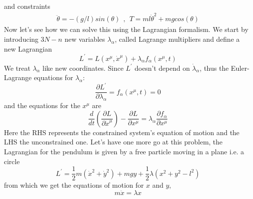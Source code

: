 and constraints
    \begin{align}
        \ddot{\theta} = -(g/l)sin(\theta) \ \ , \ \  T = ml\dot{\theta}^{2} + mg cos(\theta)
    \end{align}
Now let's see how we can solve this using the Lagrangian formalism. We start by introducing $3N-n$ new variables $\lambda_{\alpha}$, called Lagrange multipliers and define a new Lagrangian
\begin{equation}
    L^{'} = L(x^{\mu},\dot{x}^{\mu}) + \lambda_{\alpha} f_{\alpha}(x^{\mu},t)
\end{equation}
We treat $\lambda_{\alpha}$ like new coordinates. Since $L^{'}$ doesn't depend on $\dot{\lambda}_{\alpha}$, thus the Euler-Lagrange equations for $\lambda_{\alpha}$:
\begin{equation}
    \frac{\partial L^{'}}{\partial \lambda_{\alpha}} = f_{\alpha}(x^{\mu},t) = 0
\end{equation}
and the equations for the $x^{\mu}$ are
\begin{equation}
    \frac{d}{dt}\left( \frac{\partial L}{\partial \dot{x}^{\mu}} \right) - \frac{\partial L}{\partial x^{\mu}} = \lambda_{\alpha} \frac{\partial f_{\alpha}}{\partial x^{\mu}}
\end{equation}
Here the RHS represents the constrained system's equation of motion and the LHS the unconstrained one.
Let's have one more go at this problem, the Lagrangian for the pendulum is given by a free particle moving in a plane i.e. a circle
\begin{equation}
    L^{'} = \frac{1}{2}m(\dot{x}^{2} + \dot{y}^{2}) + mgy + \frac{1}{2}\lambda(x^{2} + y^{2} - l^{2})
\end{equation}
from which we get the equations of motion for $x$ and $y$,
\begin{equation}
    m \ddot{x} = \lambda x
\end{equation}
